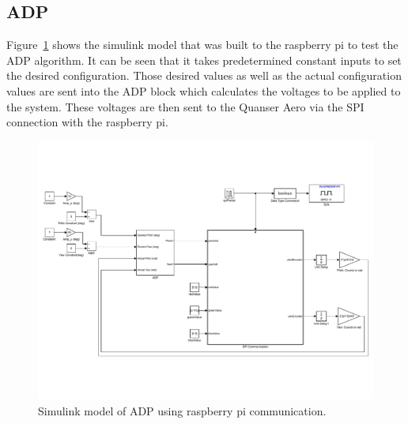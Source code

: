 \subsection{ADP}
Figure~\ref{fig:ADP_RaspPi} shows the simulink model that was built to the raspberry pi to test the ADP algorithm.  It can be seen that it takes predetermined constant inputs to set the desired configuration.  Those desired values as well as the actual configuration values are sent into the ADP block which calculates the voltages to be applied to the system.  These voltages are then sent to the Quanser Aero via the SPI connection with the raspberry pi.
\begin{figure}[!htbp]
    \centering
    \includegraphics[width=.62\textwidth,keepaspectratio=true]{figs/img/ADP_RaspPi}
    \caption{Simulink model of ADP using raspberry pi communication.}
    \label{fig:ADP_RaspPi}
\end{figure}

